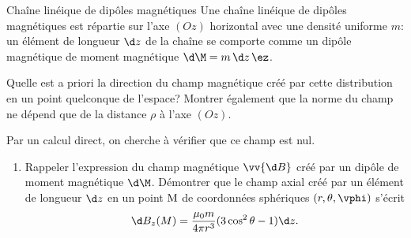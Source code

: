 	\begin{exo}[PC][3][TD]{Chaîne linéique de dipôles magnétiques}
	Une chaîne linéique de dipôles magnétiques est répartie sur l'axe $(Oz)$ horizontal avec une densité uniforme $m$: un élément de longueur $\d z$ de la chaîne se comporte comme un dipôle magnétique de moment magnétique $\d\M=m\,\d z\,\ez$.
	\begin{quest}
	\item Quelle est a priori la direction du champ magnétique créé par cette distribution en un point quelconque de l'espace? Montrer également que la norme du champ ne dépend que de la distance $\rho$ à l'axe $(Oz)$.
	\item Par un calcul direct, on cherche à vérifier que ce champ est nul.
	\begin{enumerate}
	\item Rappeler l'expression du champ magnétique $\vv{\d B}$ créé par un dipôle de moment magnétique $\d\M$.
	 Démontrer que le champ axial créé par un élément de longueur $\d z$ en un point ${\rm M}$ de coordonnées sphériques $(r,\theta,\vphi)$ s'écrit
	\begin{equation}
	\d B_z(M) =\frac{\mu_0m}{4\pi r^3}(3\cos^{2}\theta-1)\d z.
	\end{equation}
\end{enumerate}
\end{quest}
\end{exo}
